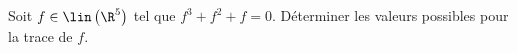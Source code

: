 \begin{enonce}
\begin{exercise}[ID={RMS 121-2 E1117 (CCP)},subtitle={},tags={}]
Soit $f\in\lin\left(\R^5\right)$ tel que $f^3+f^2+f=0$.
Déterminer les valeurs possibles pour la trace de $f$.
\end{exercise}
\begin{solution}
\end{solution}
\end{enonce}
